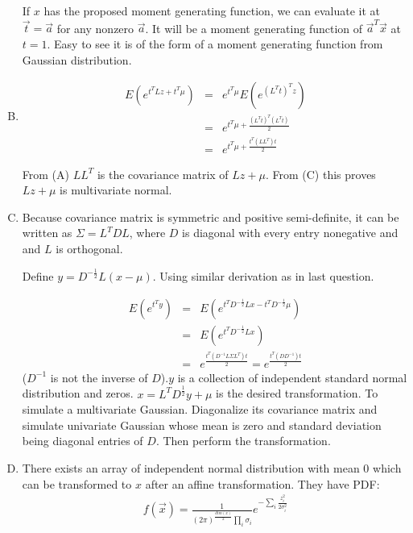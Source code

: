 \documentclass{article}
\begin{document}
\begin{enumerate}[(A)]
If $x$ has the proposed moment generating function, we can evaluate it at $\vec{t}=\vec{a}$ for any nonzero $\vec{a}$. It will be a moment generating function of $\vec{a}^T\vec{x}$ at $t=1$. Easy to see it is of the form of a moment generating function from Gaussian distribution.
\item

\begin{eqnarray}
E(e^{t^TLz+t^T\mu})&=&e^{t^T\mu}E(e^{(L^Tt)^Tz})\nonumber\\
&=&e^{t^T\mu+\frac{(L^Tt)^T(L^Tt)}{2}}\nonumber\\
&=&e^{t^T\mu+\frac{t^T(LL^T)t}{2}}
\end{eqnarray}

From (A) $LL^T$ is the covariance matrix of $Lz+\mu$. From (C) this proves $Lz+\mu$ is multivariate normal.

\item

Because covariance matrix is symmetric and positive semi-definite, it can be written as $\Sigma=L^TDL$, where $D$ is diagonal with every entry nonegative and and $L$ is orthogonal. 

Define $y=D^{-\frac{1}{2}}L(x-\mu)$. Using similar derivation as in last question.

\begin{eqnarray}
E(e^{t^Ty})&=&E(e^{t^TD^{-\frac{1}{2}}Lx-t^TD^{-\frac{1}{2}}\mu})\nonumber\\
&=&E(e^{t^TD^{-\frac{1}{2}}Lx})\nonumber\\
&=&e^{\frac{t^T(D^{-1}L\Sigma L^T)t}{2}}=e^{\frac{t^T(DD^{-1})t}{2}}
\end{eqnarray}
($D^{-1}$ is not the inverse of $D$).$y$ is a collection of independent standard normal distribution and zeros. $x=L^TD^{\frac{1}{2}}y+\mu$ is the desired transformation. To simulate a multivariate Gaussian. Diagonalize its covariance matrix and simulate univariate Gaussian whose mean is zero and standard deviation being diagonal entries of $D$. Then perform the transformation.

\item

There exists an array of independent normal distribution with mean 0 which can be transformed to $x$ after an affine transformation. They have PDF:
\begin{eqnarray}
f(\vec{x})=\frac{1}{(2\pi)^\frac{dim(x)}{2}\prod_i\sigma_i}e^{-\sum_i\frac{z_i^2}{2\sigma_i^2}}
\end{eqnarray}


\end{enumerate}
\end{document}

